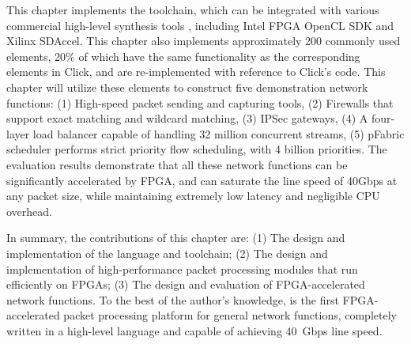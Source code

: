 This chapter implements the \name{} toolchain, which can be integrated with various commercial high-level synthesis tools \cite{vivado,aoc}, including Intel FPGA OpenCL SDK and Xilinx SDAccel. This chapter also implements approximately 200 commonly used elements, 20\% of which have the same functionality as the corresponding elements in Click, and are re-implemented with reference to Click's code. This chapter will utilize these elements to construct five demonstration network functions: (1) High-speed packet sending and capturing tools, (2) Firewalls that support exact matching and wildcard matching, (3) IPSec gateways, (4) A four-layer load balancer capable of handling 32 million concurrent streams, (5) pFabric scheduler \cite{pfabric} performs strict priority flow scheduling, with 4 billion priorities. The evaluation results demonstrate that all these network functions can be significantly accelerated by FPGA, and can saturate the line speed of 40Gbps at any packet size, while maintaining extremely low latency and negligible CPU overhead.

In summary, the contributions of this chapter are:
(1) The design and implementation of the \name language and toolchain;
(2) The design and implementation of high-performance packet processing modules that run efficiently on FPGAs;
(3) The design and evaluation of FPGA-accelerated network functions.
To the best of the author's knowledge, \name is the first FPGA-accelerated packet processing platform for general network functions, completely written in a high-level language and capable of achieving 40~Gbps line speed.


